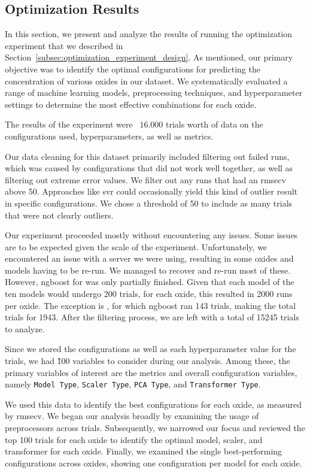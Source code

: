 \subsection{Optimization Results}\label{sec:optimization_results}
In this section, we present and analyze the results of running the optimization experiment that we described in Section~\ref{subsec:optimization_experiment_design}.
As mentioned, our primary objective was to identify the optimal configurations for predicting the concentration of various oxides in our dataset.
We systematically evaluated a range of machine learning models, preprocessing techniques, and hyperparameter settings to determine the most effective combinations for each oxide.

The results of the experiment were ~$16.000$ trials worth of data on the configurations used, hyperparameters, as well as metrics.

Our data cleaning for this dataset primarily included filtering out failed runs, which was caused by configurations that did not work well together, as well as filtering out extreme error values.
We filter out any runs that had an \gls{rmsecv} above 50.
Approaches like \gls{svr} could occasionally yield this kind of outlier result in specific configurations.
We chose a threshold of 50 to include as many trials that were not clearly outliers.

Our experiment proceeded mostly without encountering any issues.
Some issues are to be expected given the scale of the experiment.
Unfortunately, we encountered an issue with a server we were using, resulting in some oxides and models having to be re-run.
We managed to recover and re-run most of these.
However, \gls{ngboost} for  was only partially finished.
Given that each model of the ten models would undergo 200 trials, for each oxide, this resulted in 2000 runs per oxide.
The exception is , for which \gls{ngboost} ran 143 trials, making the total trials for  1943.
After the filtering process, we are left with a total of 15245 trials to analyze.

Since we stored the configurations as well as each hyperparameter value for the trials, we had \~100 variables to consider during our analysis.
Among these, the primary variables of interest are the metrics and overall configuration variables, namely \texttt{Model Type}, \texttt{Scaler Type}, \texttt{PCA Type}, and \texttt{Transformer Type}.

We used this data to identify the best configurations for each oxide, as measured by \gls{rmsecv}.
We began our analysis broadly by examining the usage of preprocessors across trials. Subsequently, we narrowed our focus and reviewed the top 100 trials for each oxide to identify the optimal model, scaler, and transformer for each oxide.
Finally, we examined the single best-performing configurations across oxides, showing one configuration per model for each oxide.

